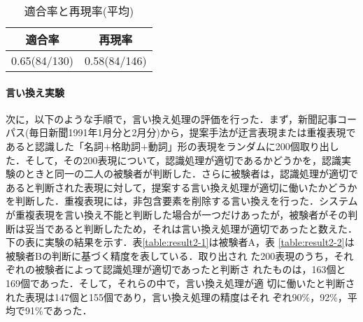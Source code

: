 \documentclass{nlp}
\begin{document}
\begin{table}[h]
 \begin{center}
  \caption{適合率と再現率(平均)}
  \label{table:result3-3}
    \begin{tabular}{c|c}\hline
    適合率            & 再現率       \\ \hline
    0.65(84/130)      & 0.58(84/146)  \\ \hline
    \end{tabular}
 \end{center}
\end{table}


\paragraph{言い換え実験}
次に，以下のような手順で，言い換え処理の評価を行った．まず，新聞記事コー
パス(毎日新聞1991年1月分と2月分)から，提案手法が迂言表現または重複表現で
あると認識した「名詞$+$格助詞$+$動詞」形の表現をランダムに200個取り出し
た．そして，その200表現について，認識処理が適切であるかどうかを，認識実
験のときと同一の二人の被験者が判断した．さらに被験者は，認識処理が適切で
あると判断された表現に対して，提案する言い換え処理が適切に働いたかどうか
を判断した．重複表現には，非包含要素を削除する言い換えを行った．システム
が重複表現を言い換え不能と判断した場合が一つだけあったが，被験者がその判
断は妥当であると判断したため，それは言い換え処理が適切であったと数えた．
下の表に実験の結果を示す．表\ref{table:result2-1}は被験者A，表
\ref{table:result2-2}は被験者Bの判断に基づく精度を表している．取り出され
た200表現のうち，それぞれの被験者によって認識処理が適切であったと判断さ
れたものは，163個と169個であった．そして，それらの中で，言い換え処理が適
切に働いたと判断された表現は147個と155個であり，言い換え処理の精度はそれ
ぞれ90\%，92\%，平均で91\%であった．
\end{document}
